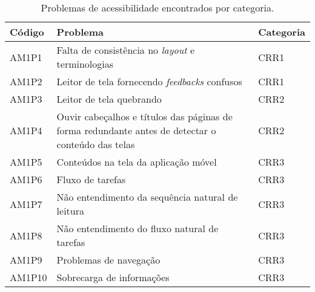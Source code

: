 \begin{table}[htb]
    \begin{center}
        \ABNTEXfontereduzida
        \caption{Problemas de acessibilidade encontrados por categoria.}
        \label{tab-pro-enc-ar5}
        \begin{tabular}{p{1.2cm}|p{11.5cm}|p{1.5cm}}
            \textbf{Código} & \textbf{Problema}                                                                                 & \textbf{Categoria} \\
            \hline
            AM1P1           & Falta de consistência no \emph{layout} e terminologias                                            & CRR1               \\
            \hline
            AM1P2           & Leitor de tela fornecendo \emph{feedbacks} confusos                                               & CRR1               \\
            \hline
            AM1P3           & Leitor de tela quebrando                                                                          & CRR2               \\
            \hline
            AM1P4           & Ouvir cabeçalhos e títulos das páginas de forma redundante antes de detectar o conteúdo das telas & CRR2               \\
            \hline
            AM1P5           & Conteúdos na tela da aplicação móvel                                                              & CRR3               \\
            \hline
            AM1P6           & Fluxo de tarefas                                                                                  & CRR3               \\
            \hline
            AM1P7           & Não entendimento da sequência natural de leitura                                                  & CRR3               \\
            \hline
            AM1P8           & Não entendimento do fluxo natural de tarefas                                                      & CRR3               \\
            \hline
            AM1P9           & Problemas de navegação                                                                            & CRR3               \\
            \hline
            AM1P10          & Sobrecarga de informações                                                                         & CRR3               \\
        \end{tabular}
    \end{center}
\end{table}

